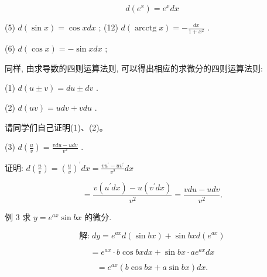 \documentclass[lang=cn,newtx,10pt,scheme=chinese]{elegantbook}
\begin{document}
\[
d\left( {e}^{x}\right) = {e}^{x}{dx}
\]

(5) \(d\left( {\sin x}\right) = \cos {xdx}\) ; (12) \(d\left( {\operatorname{arcctg}x}\right) = - \frac{dx}{1 + {x}^{2}}\) .

(6) \(d\left( {\cos x}\right) = - \sin {xdx}\) ;

同样, 由求导数的四则运算法则, 可以得出相应的求微分的四则运算法则:

(1) \(d\left( {u \pm v}\right) = {du} \pm {dv}\) .

(2) \(d\left( {uv}\right) = {udv} + {vdu}\) .

请同学们自己证明(1)、(2)。

(3) \(d\left( \frac{u}{v}\right) = \frac{{vdu} - {udv}}{{v}^{2}}\) .

证明: \(d\left( \frac{u}{v}\right) = {\left( \frac{u}{v}\right) }^{\prime }{dx} = \frac{v{u}^{\prime } - u{v}^{\prime }}{{v}^{2}}{dx}\)

\[
= \frac{v\left( {{u}^{\prime }{dx}}\right) - u\left( {{v}^{\prime }{dx}}\right) }{{v}^{2}} = \frac{{vdu} - {udv}}{{v}^{2}}.
\]

例 3 求 \(y = {e}^{ax}\sin {bx}\) 的微分.

\[
\text{解:}\;{dy} = {e}^{ax}d\left( {\sin {bx}}\right) + \sin {bxd}\left( {e}^{ax}\right)
\]

\[
= {e}^{ax} \cdot b\cos {bxdx} + \sin {bx} \cdot a{e}^{ax}{dx}
\]

\[
= {e}^{ax}\left( {b\cos {bx} + a\sin {bx}}\right) {dx}\text{.}
\]
\end{document}
